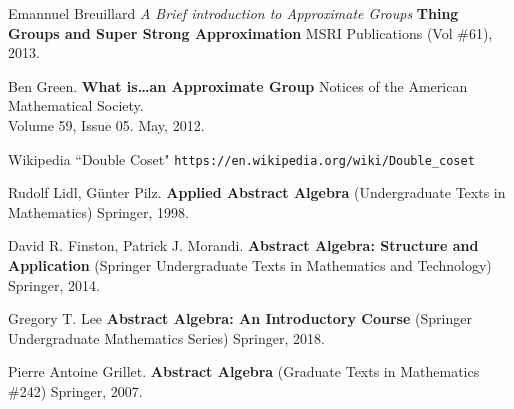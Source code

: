 \documentclass[12pt]{article}
\begin{document}
\begin{thebibliography}{} 

\item Emannuel Breuillard \textit{A Brief introduction to Approximate Groups} 
\textbf{Thing Groups and Super Strong Approximation} MSRI Publications (Vol \#61), 2013. 

\item Ben Green. \textbf{What is\dots an Approximate Group} Notices of the American Mathematical Society. \\  Volume 59, Issue 05. May, 2012.

\item Wikipedia ``Double Coset" \texttt{https://en.wikipedia.org/wiki/Double\_{}coset} 

\item Rudolf Lidl, G\"{u}nter Pilz.  \textbf{Applied Abstract Algebra} (Undergraduate Texts in Mathematics) Springer, 1998.

\item David R. Finston, Patrick J. Morandi. \textbf{Abstract Algebra: Structure and Application} (Springer Undergraduate Texts in Mathematics and Technology) Springer, 2014.

\item Gregory T. Lee \textbf{Abstract Algebra: An Introductory Course} (Springer Undergraduate Mathematics Series) Springer, 2018.

\item Pierre Antoine Grillet. \textbf{Abstract Algebra} (Graduate Texts in Mathematics \#242) Springer, 2007.


\end{thebibliography}

\newpage
\end{document}
